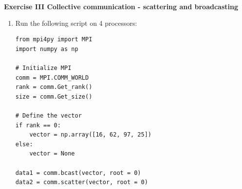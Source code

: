 \documentclass[11pt]{article}
\begin{document}
\bigskip

{\bf{Exercise III Collective communication - scattering and broadcasting}}\\

\begin{enumerate}
    \item Run the following script on 4 processors:  
    \begin{verbatim}
from mpi4py import MPI
import numpy as np

# Initialize MPI
comm = MPI.COMM_WORLD
rank = comm.Get_rank()
size = comm.Get_size()

# Define the vector
if rank == 0:
    vector = np.array([16, 62, 97, 25])
else:
    vector = None

data1 = comm.bcast(vector, root = 0)
data2 = comm.scatter(vector, root = 0)


\end{verbatim}
\end{enumerate}
\end{document}
